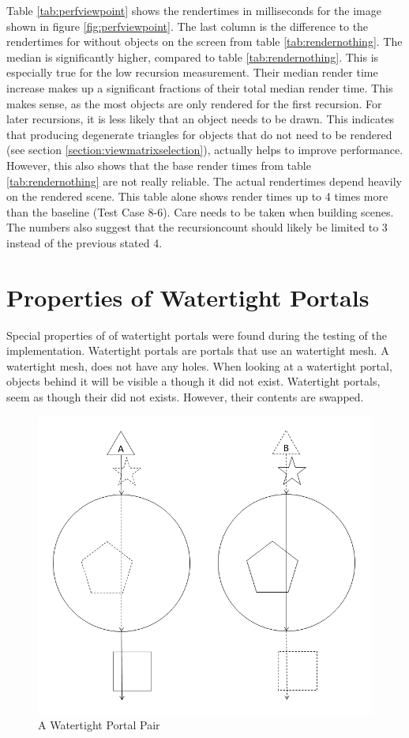 Table \ref{tab:perfviewpoint} shows the rendertimes in milliseconds for the image shown in figure \ref{fig:perfviewpoint}. The last column is the difference to the rendertimes for without objects on the screen from table \ref{tab:rendernothing}. The median is significantly higher, compared to table \ref{tab:rendernothing}. This is especially true for the low recursion measurement. Their median render time increase makes up a significant fractions of their total median render time. This makes sense, as the most objects are only rendered for the first recursion. For later recursions, it is less likely that an object needs to be drawn. This indicates that producing degenerate triangles for objects that do not need to be rendered (see section \ref{section:viewmatrixselection}), actually helps to improve performance. However, this also shows that the base render times from table \ref{tab:rendernothing} are not really reliable. The actual rendertimes depend heavily on the rendered scene. This table alone shows render times up to 4 times more than the baseline (Test Case 8-6). Care needs to be taken when building scenes. The numbers also suggest that the \gls{recursioncount} should likely be limited to 3 instead of the previous stated 4.


\section{Properties of Watertight Portals}
\label{section:watertight}
Special properties of of watertight portals were found during the testing of the implementation. Watertight portals are portals that use an watertight mesh. A watertight mesh, does not have any holes. When looking at a watertight portal, objects behind it will be visible a though it did not exist. Watertight portals, seem as though their did not exists. However, their contents are swapped.

\begin{figure}[h]
	\centering
	\includegraphics[width=0.8\linewidth]{images/watertight.png}
	\caption{A Watertight Portal Pair}
	\label{fig:watertightportals}
\end{figure}

